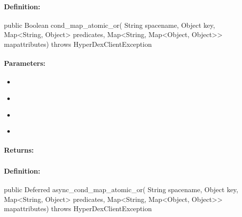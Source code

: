 \paragraph{Definition:}
\begin{javacode}
public Boolean cond_map_atomic_or(
        String spacename,
        Object key,
        Map<String, Object> predicates,
        Map<String, Map<Object, Object>> mapattributes) throws HyperDexClientException
\end{javacode}

\paragraph{Parameters:}
\begin{itemize}[noitemsep]
\item {}\\

\item {}\\

\item {}\\

\item {}\\

\end{itemize}

\paragraph{Returns:}


\pagebreak
\subsubsection{}
\label{api:java:async_cond_map_atomic_or}


\paragraph{Definition:}
\begin{javacode}
public Deferred async_cond_map_atomic_or(
        String spacename,
        Object key,
        Map<String, Object> predicates,
        Map<String, Map<Object, Object>> mapattributes) throws HyperDexClientException
\end{javacode}

